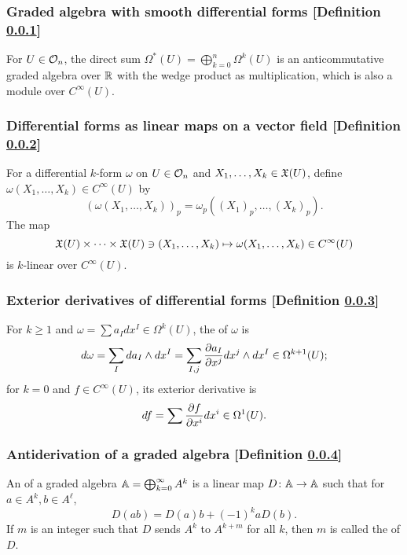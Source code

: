 \subsubsection{Graded algebra with smooth differential forms [Definition \ref{graded-algebra-with-smooth-differential-forms}]}\label{graded-algebra-with-smooth-differential-forms}
For $U \in \mathcal{O}_{n}$, the direct sum $\Omega^* (U) = \bigoplus_{k = 0}^n \Omega^k(U)$ is an anticommutative graded algebra over $\mathbb{R}$ with the wedge product as multiplication, which is also a module over $C^\infty (U)$.


\subsubsection{Differential forms as linear maps on a vector field [Definition \ref{differential-forms-as-linear-maps-on-a-vector-field}]}\label{differential-forms-as-linear-maps-on-a-vector-field}
For a differential $k$-form $\omega$ on $U \in \mathcal{O}_{n}$ and $X_1, \dotsc, X_k \in \mathfrak{X}(U)$, define $\omega (X_1, \dotsc, X_k) \in C^\infty(U)$ by
\[
(\omega (X_1, \dotsc, X_k))_p = \omega_p ((X_1)_p, \dotsc, (X_k)_p).
\]
The map
\[
\mathfrak{X}(U) \times \dotsm \times \mathfrak{X}(U) \ni (X_1, \dotsc, X_k) \mapsto \omega(X_1, \dotsc, X_k) \in C^\infty(U)
\]
is $k$-linear over $C^\infty(U)$.

\subsubsection{Exterior derivatives of differential forms [Definition \ref{exterior-derivatives-of-differential-forms}]}\label{exterior-derivatives-of-differential-forms}
For $k \ge 1$ and $\omega = \sum a_I dx^I \in \Omega^k(U)$, the  of $\omega$ is
\[
d\omega = \sum_I da_I \wedge dx^I = \sum_{I,j} \pfr{a_I}{x^j} dx^j \wedge dx^I \in \Omega^{k+1}(U);
\]
for $k = 0$ and $f \in C^\infty(U)$, its exterior derivative is
\[
df = \sum \pfr{f}{x^i} dx^i\in \Omega^1 (U).
\]

\subsubsection{Antiderivation of a graded algebra [Definition \ref{antiderivation-of-a-graded-algebra}]}\label{antiderivation-of-a-graded-algebra}
An  of a graded algebra $\mathbb{A} = \bigoplus_{k=0}^\infty A^k$ is a linear map $D \colon \mathbb{A} \to \mathbb{A}$ such that for $a \in A^k, b \in A^\ell$,
\[
D(ab) = D(a)b + (-1)^k aD(b).
\]
If $m$ is an integer such that $D$ sends $A^k$ to $A^{k+m}$ for all $k$, then $m$ is called the  of $D$.

